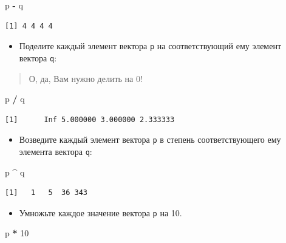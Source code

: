 \documentclass[
]{book}
\newenvironment{Shaded}{\begin{snugshade}}{\end{snugshade}}
\newcommand{\DecValTok}[1]{\textcolor[rgb]{0.00,0.00,0.81}{#1}}
\newcommand{\NormalTok}[1]{#1}
\newcommand{\OperatorTok}[1]{\textcolor[rgb]{0.81,0.36,0.00}{\textbf{#1}}}
\newcommand{\StringTok}[1]{\textcolor[rgb]{0.31,0.60,0.02}{#1}}
\providecommand{\tightlist}{%
  \setlength{\itemsep}{0pt}\setlength{\parskip}{0pt}}
\begin{document}
\begin{Shaded}
\begin{Highlighting}[]
\NormalTok{p }\OperatorTok{-}\StringTok{ }\NormalTok{q}
\end{Highlighting}
\end{Shaded}

\begin{verbatim}
[1] 4 4 4 4
\end{verbatim}

\begin{itemize}
\tightlist
\item
  Поделите каждый элемент вектора \texttt{p} на соответствующий ему элемент вектора \texttt{q}:
\end{itemize}

\begin{quote}
О, да, Вам нужно делить на 0!
\end{quote}

\begin{Shaded}
\begin{Highlighting}[]
\NormalTok{p }\OperatorTok{/}\StringTok{ }\NormalTok{q}
\end{Highlighting}
\end{Shaded}

\begin{verbatim}
[1]      Inf 5.000000 3.000000 2.333333
\end{verbatim}

\begin{itemize}
\tightlist
\item
  Возведите каждый элемент вектора \texttt{p} в степень соответствующего ему элемента вектора \texttt{q}:
\end{itemize}

\begin{Shaded}
\begin{Highlighting}[]
\NormalTok{p }\OperatorTok{^}\StringTok{ }\NormalTok{q}
\end{Highlighting}
\end{Shaded}

\begin{verbatim}
[1]   1   5  36 343
\end{verbatim}

\begin{itemize}
\tightlist
\item
  Умножьте каждое значение вектора \texttt{p} на 10.
\end{itemize}

\begin{Shaded}
\begin{Highlighting}[]
\NormalTok{p }\OperatorTok{*}\StringTok{ }\DecValTok{10}
\end{Highlighting}
\end{Shaded}
\end{document}
